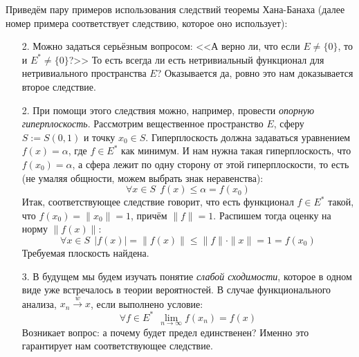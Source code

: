 \begin{example}
	Приведём пару примеров использования следствий теоремы Хана-Банаха (далее номер примера соответствует следствию, которое оно использует):
	\begin{enumerate}
		\item[2.] Можно задаться серьёзным вопросом: <<А верно ли, что если $E \neq \{0\}$, то и $E^* \neq \{0\}$?>> То есть всегда ли есть нетривиальный функционал для нетривиального пространства $E$? Оказывается да, ровно это нам доказывается второе следствие.
		
		\item[2.] При помощи этого следствия можно, например, провести \textit{опорную гиперплоскость}. Рассмотрим вещественное пространство $E$, сферу $S := S(0, 1)$ и точку $x_0 \in S$. Гиперплоскость должна задаваться уравнением $f(x) = \alpha$, где $f \in E^*$ как минимум. И нам нужна такая гиперплоскость, что $f(x_0) = \alpha$, а сфера лежит по одну сторону от этой гиперплоскости, то есть (не умаляя общности, можем выбрать знак неравенства):
		\[
			\forall x \in S\ \ f(x) \le \alpha = f(x_0)
		\]
		Итак, соответствующее следствие говорит, что есть функционал $f \in E^*$ такой, что $f(x_0) = \|x_0\| = 1$, причём $\|f\| = 1$. Распишем тогда оценку на норму $\|f(x)\|$:
		\[
			\forall x \in S\ \ |f(x)| = \|f(x)\| \le \|f\| \cdot \|x\| = 1 = f(x_0)
		\]
		Требуемая плоскость найдена.
		
		\item[3.] В будущем мы будем изучать понятие \textit{слабой сходимости}, которое в одном виде уже встречалось в теории вероятностей. В случае функционального анализа, $x_n \xrightarrow{w} x$, если выполнено условие:
		\[
			\forall f \in E^*\ \ \lim_{n \to \infty} f(x_n) = f(x)
		\]
		Возникает вопрос: а почему будет предел единственен? Именно это гарантирует нам соответствующее следствие.
	\end{enumerate}
\end{example}
